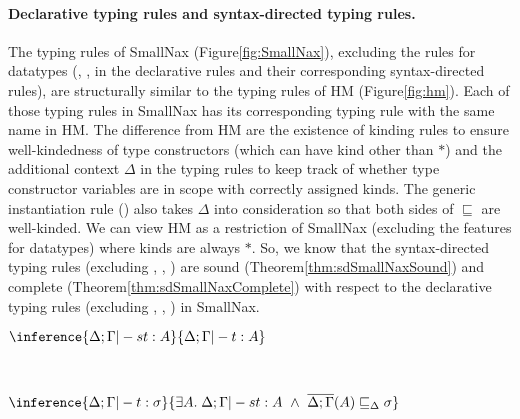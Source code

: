\paragraph{Declarative typing rules and syntax-directed typing rules.}
The typing rules of SmallNax (Figure\;\ref{fig:SmallNax}),
excluding the rules for datatypes (, ,
 in the declarative rules and their corresponding
syntax-directed rules), are structurally similar to the typing rules of HM
(Figure\;\ref{fig:hm}). Each of those typing rules in SmallNax has
its corresponding typing rule with the same name in HM.
The difference from HM are the existence of kinding rules to ensure
well-kindedness of type constructors (which can have kind other than $*$)
and the additional context $\Delta$ in the typing rules to keep track of
whether type constructor variables are in scope with correctly assigned kinds.
The generic instantiation rule () also takes $\Delta$ into
consideration so that both sides of $\sqsubseteq$ are well-kinded. We can view
HM as a restriction of SmallNax (excluding the features for datatypes) where
kinds are always $*$. So, we know that the syntax-directed typing rules
(excluding , , )
are sound (Theorem\;\ref{thm:sdSmallNaxSound}) and
complete (Theorem\;\ref{thm:sdSmallNaxComplete})
with respect to the declarative typing rules
(excluding , , ) in SmallNax.
\begin{theorem}
$ \inference{\Delta;\Gamma |-s t : A}{\Delta;\Gamma |- t : A} $
\label{thm:sdSmallNaxSound}
\end{theorem}
\begin{theorem} ~
\begin{center}
$ \inference{\Delta;\Gamma |- t : \sigma}{
	\exists A.\;\Delta;\Gamma |-s t : A ~\land~
	\overline{\Delta;\Gamma}(A) \sqsubseteq_\Delta \sigma} $
\end{center}
\label{thm:sdSmallNaxComplete}
\end{theorem}

